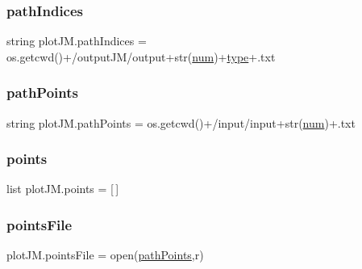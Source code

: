 \subsubsection{\texorpdfstring{path\+Indices}{pathIndices}}
{\footnotesize\ttfamily string plot\+J\+M.\+path\+Indices = os.\+getcwd()+\textquotesingle{}/output\+JM/output\textquotesingle{}+str(\hyperlink{namespaceplotJM_aa893f2c8f47574915a4cc130164ba160}{num})+\hyperlink{namespaceplotJM_aece5bd26b7eba5b9cc746654691880c0}{type}+\textquotesingle{}.txt\textquotesingle{}}

\mbox{\label{namespaceplotJM_a7e306c9d020e3a82daec94c8a7981b5e}} 
\subsubsection{\texorpdfstring{path\+Points}{pathPoints}}
{\footnotesize\ttfamily string plot\+J\+M.\+path\+Points = os.\+getcwd()+\textquotesingle{}/input/input\textquotesingle{}+str(\hyperlink{namespaceplotJM_aa893f2c8f47574915a4cc130164ba160}{num})+\textquotesingle{}.txt\textquotesingle{}}

\mbox{\label{namespaceplotJM_a4736c91f6642a68255bc59e25177f6b6}} 
\subsubsection{\texorpdfstring{points}{points}}
{\footnotesize\ttfamily list plot\+J\+M.\+points = \mbox{[}$\,$\mbox{]}}

\mbox{\label{namespaceplotJM_a1981504f48dad7742cddc6613eb4819f}} 
\subsubsection{\texorpdfstring{points\+File}{pointsFile}}
{\footnotesize\ttfamily plot\+J\+M.\+points\+File = open(\hyperlink{namespaceplotJM_a7e306c9d020e3a82daec94c8a7981b5e}{path\+Points},\textquotesingle{}r\textquotesingle{})}

\mbox{\label{namespaceplotJM_adf22560b07746c190ca82c2067a72af5}} 

